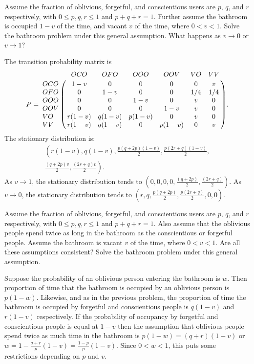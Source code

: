 \documentclass[12pt]{article}
\begin{document}
\begin{enumerate}
\begin{exercise}
    Assume the fraction of oblivious, forgetful, and conscientious users
    are \( p \), \( q \), and \( r \) respectively, with \( 0 \le p,q,r
    \le 1 \) and \( p + q + r = 1 \).  Further assume the bathroom is
    occupied \( 1-v \) of the time, and vacant \( v \) of the time,
    where \( 0 < v < 1 \).  Solve the bathroom problem under this
    general assumption.  What happens as \( v \to 0 \) or \( v \to 1 \)?
\end{exercise}
\begin{solution}
    The transition probability matrix is
    \[
        P= \bordermatrix{ & OCO & OFO & OOO & OOV & VO & VV \cr
        OCO & 1-v & 0 & 0 & 0 & 0 & v \cr
        OFO & 0 & 1-v & 0 & 0 & 1/4 & 1/4 \cr
        OOO & 0 & 0 & 1-v & 0 & v & 0 \cr
        OOV & 0 & 0 & 0 & 1-v & v & 0 \cr
        VO & r(1-v) & q(1-v) & p(1-v) & 0 & v & 0 \cr
        VV & r(1-v) & q(1-v) & 0 & p(1-v) & 0 & v \cr
        }.
      \] The stationary distribution is:
      \begin{multline*}
        \left( r(1-v), q(1-v), \frac{p(q + 2p)(1-v)}{2}, \frac{p(2r + q)
            (1-v)}{2}, \right.\\
          \left. \frac{(q + 2p)v}{2}, \frac{(2r + q)v}{2} \right).
      \end{multline*}
    As \( v \to 1 \), the stationary distribution tends to \( \left(0,
    0, 0, 0, \frac{(q + 2p)}{2}, \frac{(2r + q)}{2} \right) \). As \( v
    \to 0 \), the stationary distribution tends to \( \left(r, q, \frac{p
    (q + 2p)}{2}, \frac{p(2r + q)}{2}, 0, 0 \right) \).
\end{solution}

\begin{exercise}
    Assume the fraction of oblivious, forgetful, and conscientious users
    are \( p \), \( q \), and \( r \) respectively, with \( 0 \le p,q,r
    \le 1 \) and \( p + q + r = 1 \).  Also assume that the oblivious
    people spend twice as long in the bathroom as the conscientious or
    forgetful people.  Assume the bathroom is vacant \( v \) of the
    time, where \( 0 < v < 1 \).  Are all these assumptions consistent?
    Solve the bathroom problem under this general assumption.
\end{exercise}
\begin{solution}
    Suppose the probability of an oblivious person entering the bathroom
    is \( w \).  Then proportion of time that the bathroom is occupied
    by an oblivious person is \( p(1-w) \).  Likewise, and as in the
    previous problem, the proportion of time the bathroom is occupied by
    forgetful and conscientious people is \( q(1-v) \) and \( r(1-v) \)
    respectively.  If the probability of occupancy by forgetful and
    conscientious people is equal at \( 1-v \) then the assumption that
    oblivious people spend twice as much time in the bathroom is \( p(1-w)
    = (q + r)(1-v) \) or \( w = 1 - \frac{q + r}{p} (1-v) = \frac{1-p}{p}
    (1-v) \).  Since \( 0 < w < 1 \), this puts some restrictions
    depending on \( p \) and \( v \).


\end{solution}
\end{enumerate}
\end{document}
